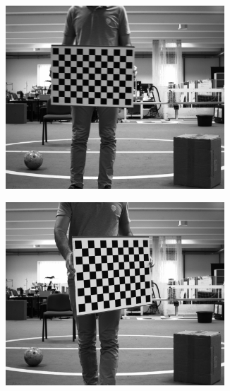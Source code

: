 \begin{figure}[h]
	\centering
	\begin{subfigure}[c]{0.30\textwidth}
		\includegraphics[width=0.9\textwidth]{img/camera-calibration/left-0001.png}
	\end{subfigure}
	\begin{subfigure}[c]{0.30\textwidth}
		\includegraphics[width=0.9\textwidth]{img/camera-calibration/left-0005.png}
	\end{subfigure}
	\begin{subfigure}[c]{0.30\textwidth}

\end{subfigure}
\end{figure}
